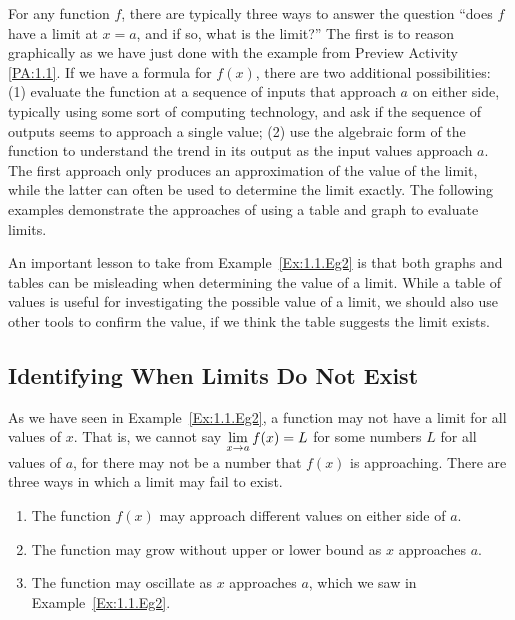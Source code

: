 For any function $f$, there are typically three ways to answer the question ``does $f$ have a limit at $x = a$, and if so, what is the limit?''  The first is to reason graphically as we have just done with the example from Preview Activity \ref{PA:1.1}.  If we have a formula for $f(x)$, there are two additional possibilities:  (1) evaluate the function at a sequence of inputs that approach $a$ on either side, typically using some sort of computing technology, and ask if the sequence of outputs seems to approach a single value; (2) use the algebraic form of the function to understand the trend in its output as the input values approach $a$.  The first approach only produces an approximation of the value of the limit, while the latter can often be used to determine the limit exactly.  The following examples demonstrate the  approaches of using a table and graph to evaluate limits.




An important lesson to take from Example~\ref{Ex:1.1.Eg2} is that both graphs and tables can be misleading when determining the value of a limit.  While a table of values is useful for investigating the possible value of a limit, we should also use other tools to confirm the value, if we think the table suggests the limit exists.

\subsection{Identifying When Limits Do Not Exist}

As we have seen in Example~\ref{Ex:1.1.Eg2}, a function may not have a limit for all values of $x$. That is, we cannot say $\displaystyle \lim_{x\to a}f(x)=L$ for some numbers $L$ for all values of $a$, for there may not be a number that $f(x)$ is approaching. There are three ways in which a limit may fail to exist. 
\begin{enumerate}[1)]
\item The function $f(x)$ may approach different values on either side of $a$.
\item The function may grow without upper or lower bound as $x$ approaches $a$.
\item The function may oscillate as $x$ approaches $a$, which we saw in Example~\ref{Ex:1.1.Eg2}.
\end{enumerate}

